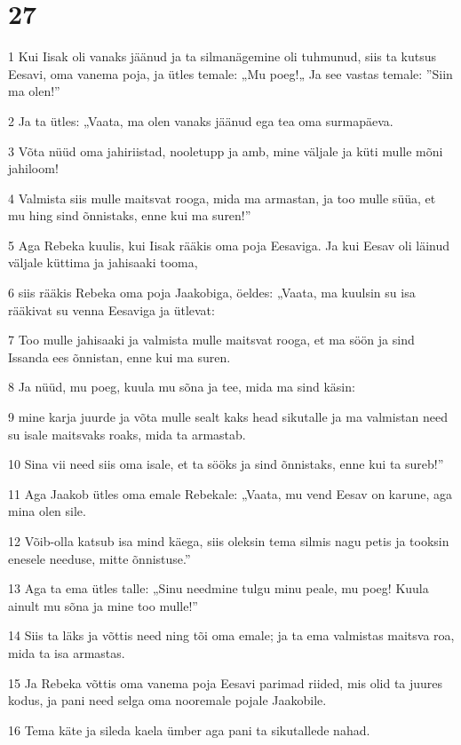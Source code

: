 \chapter{27}

\par 1 Kui Iisak oli vanaks jäänud ja ta silmanägemine oli tuhmunud, siis ta kutsus Eesavi, oma vanema poja, ja ütles temale: „Mu poeg!„ Ja see vastas temale: ”Siin ma olen!”
\par 2 Ja ta ütles: „Vaata, ma olen vanaks jäänud ega tea oma surmapäeva.
\par 3 Võta nüüd oma jahiriistad, nooletupp ja amb, mine väljale ja küti mulle mõni jahiloom!
\par 4 Valmista siis mulle maitsvat rooga, mida ma armastan, ja too mulle süüa, et mu hing sind õnnistaks, enne kui ma suren!”
\par 5 Aga Rebeka kuulis, kui Iisak rääkis oma poja Eesaviga. Ja kui Eesav oli läinud väljale küttima ja jahisaaki tooma,
\par 6 siis rääkis Rebeka oma poja Jaakobiga, öeldes: „Vaata, ma kuulsin su isa rääkivat su venna Eesaviga ja ütlevat:
\par 7 Too mulle jahisaaki ja valmista mulle maitsvat rooga, et ma söön ja sind Issanda ees õnnistan, enne kui ma suren.
\par 8 Ja nüüd, mu poeg, kuula mu sõna ja tee, mida ma sind käsin:
\par 9 mine karja juurde ja võta mulle sealt kaks head sikutalle ja ma valmistan need su isale maitsvaks roaks, mida ta armastab.
\par 10 Sina vii need siis oma isale, et ta sööks ja sind õnnistaks, enne kui ta sureb!”
\par 11 Aga Jaakob ütles oma emale Rebekale: „Vaata, mu vend Eesav on karune, aga mina olen sile.
\par 12 Võib-olla katsub isa mind käega, siis oleksin tema silmis nagu petis ja tooksin enesele needuse, mitte õnnistuse.”
\par 13 Aga ta ema ütles talle: „Sinu needmine tulgu minu peale, mu poeg! Kuula ainult mu sõna ja mine too mulle!”
\par 14 Siis ta läks ja võttis need ning tõi oma emale; ja ta ema valmistas maitsva roa, mida ta isa armastas.
\par 15 Ja Rebeka võttis oma vanema poja Eesavi parimad riided, mis olid ta juures kodus, ja pani need selga oma nooremale pojale Jaakobile.
\par 16 Tema käte ja sileda kaela ümber aga pani ta sikutallede nahad.
